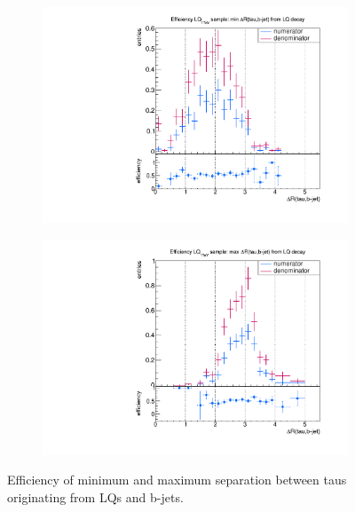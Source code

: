 \begin{figure}
\begin{subfigure}[t]{0.49\textwidth}
                \label{dRFromLQ:signal:taubjet:maxLQ75}
                \end{subfigure}
                \begin{subfigure}[t]{0.49\textwidth}
                \includegraphics[width=\textwidth]{figures/plots/LQ76/Divided_mindR_fromLQ_taubjet.pdf}
                \label{dRFromLQ:signal:taubjet:minLQ76}
                \end{subfigure}
                \begin{subfigure}[t]{0.49\textwidth}
                \includegraphics[width=\textwidth]{figures/plots/LQ76/Divided_maxdR_fromLQ_taubjet.pdf}
                \label{dRFromLQ:signal:taubjet:maxLQ76}
                \end{subfigure}
\caption[Efficiency of separation between taus originating from LQs and b-jets.]{Efficiency of minimum and maximum separation between taus originating from LQs and b-jets.}
\label{dRFromLQ:signal:taubjet}
\end{figure}
%
